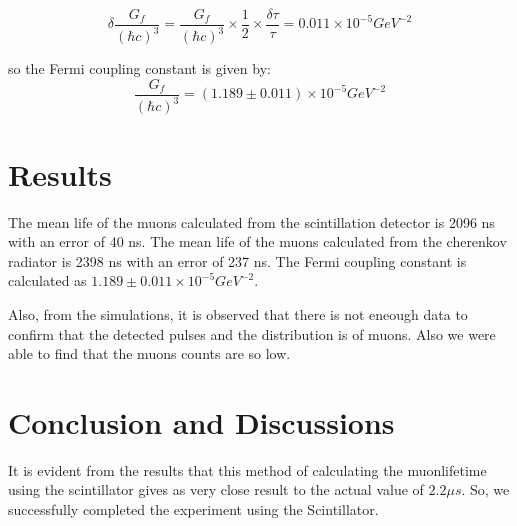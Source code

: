 \documentclass{article}
\begin{document}
\begin{multicols}{2}
\begin{equation}
    \delta \frac{G_f}{(\hbar c)^3} = \frac{G_f}{(\hbar c)^3} \times \frac{1}{2} \times \frac{\delta \tau}{\tau} = 0.011 \times 10^{-5} GeV^{-2}
\end{equation}

so the Fermi coupling constant is given by:
\begin{equation}
    \frac{G_f}{(\hbar c)^3} = (1.189 \pm 0.011) \times 10^{-5} GeV^{-2}
\end{equation}



\section{\label{results}Results}

The mean life of the muons calculated from the scintillation detector is 2096 ns with an error of 40 ns. The mean life of the muons calculated from the cherenkov radiator is 2398 ns with an error of 237 ns. The Fermi coupling constant is calculated as $1.189 \pm 0.011 \times 10^{-5} GeV^{-2}$.


Also, from the simulations, it is observed that there is not eneough data to confirm that the detected pulses and the distribution is of muons. Also we were able to find that the muons counts are so low.

\section{\label{Conclusion}Conclusion and Discussions}

It is evident from the results that this method of calculating the muonlifetime using the scintillator gives as very close result to the actual value of $2.2 \mu s$. So, we successfully completed the experiment using the Scintillator. 


\end{multicols}
\end{document}
